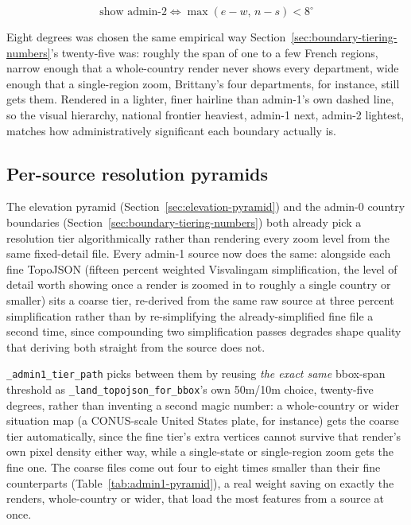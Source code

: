 \documentclass[11pt]{article}
\begin{document}
\[
\text{show admin-2} \iff \max(e-w,\, n-s) < 8^\circ
\]

Eight degrees was chosen the same empirical way
Section~\ref{sec:boundary-tiering-numbers}'s twenty-five was: roughly
the span of one to a few French regions, narrow enough that a
whole-country render never shows every department, wide enough that a
single-region zoom, Brittany's four departments, for instance, still
gets them. Rendered in a lighter, finer hairline than admin-1's own
dashed line, so the visual hierarchy, national frontier heaviest,
admin-1 next, admin-2 lightest, matches how administratively
significant each boundary actually is.

\subsection{Per-source resolution pyramids}

The elevation pyramid (Section~\ref{sec:elevation-pyramid}) and the
admin-0 country boundaries (Section~\ref{sec:boundary-tiering-numbers})
both already pick a resolution tier algorithmically rather than
rendering every zoom level from the same fixed-detail file. Every
admin-1 source now does the same: alongside each fine TopoJSON
(fifteen percent weighted Visvalingam simplification, the level of
detail worth showing once a render is zoomed in to roughly a single
country or smaller) sits a coarse tier, re-derived from the same raw
source at three percent simplification rather than by re-simplifying
the already-simplified fine file a second time, since compounding two
simplification passes degrades shape quality that deriving both
straight from the source does not.

\texttt{\_admin1\_tier\_path} picks between them by reusing
\emph{the exact same} bbox-span threshold as
\texttt{\_land\_topojson\_for\_bbox}'s own 50m/10m choice, twenty-five
degrees, rather than inventing a second magic number: a whole-country
or wider situation map (a CONUS-scale United States plate, for
instance) gets the coarse tier automatically, since the fine tier's
extra vertices cannot survive that render's own pixel density either
way, while a single-state or single-region zoom gets the fine one. The
coarse files come out four to eight times smaller than their fine
counterparts (Table~\ref{tab:admin1-pyramid}), a real weight saving on
exactly the renders, whole-country or wider, that load the most
features from a source at once.
\end{document}
